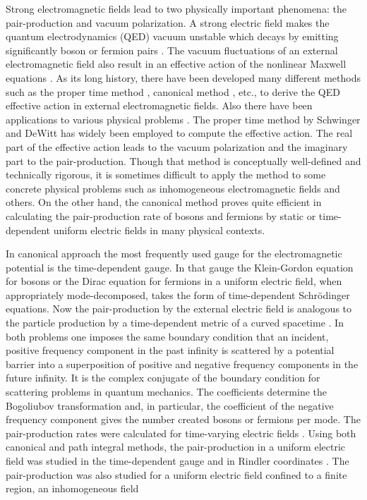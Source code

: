 \documentclass[a4paper,prd,showpacs,preprintnumbers,amsmath,amssymb]{revtex4}
\begin{document}
Strong electromagnetic fields lead to two physically important
phenomena: the pair-production and vacuum polarization. A strong
electric field makes the quantum electrodynamics (QED) vacuum
unstable which decays by emitting significantly boson or fermion
pairs \cite{sau,hei,sch}. The vacuum fluctuations of an external
electromagnetic field also result in an effective action of the
nonlinear Maxwell equations \cite{hei,sch,wei}.  As its long
history, there have been developed many different methods such as
the proper time method \cite{sch,dew}, canonical method
\cite{dew}, etc., to derive the QED effective action in external
electromagnetic fields. Also there have been applications to
various physical problems \cite{gre}. The proper time method by
Schwinger \cite{sch} and DeWitt \cite{dew} has widely been
employed to compute the effective action. The real part of the
effective action leads to the vacuum polarization and the
imaginary part to the pair-production. Though that method is
conceptually well-defined and technically rigorous, it is
sometimes difficult to apply the method to some concrete physical
problems such as inhomogeneous electromagnetic fields and others.
On the other hand, the canonical method \cite{dew} proves quite
efficient in calculating the pair-production rate of bosons and
fermions by static or time-dependent uniform electric fields in
many physical contexts.





In canonical approach the most frequently used gauge for the
electromagnetic potential is the time-dependent gauge. In that
gauge the Klein-Gordon equation for bosons or the Dirac equation
for fermions in a uniform electric field, when appropriately
mode-decomposed, takes the form of time-dependent Schr\"{o}dinger
equations. Now the pair-production by the external electric field
is analogous to the particle production by a time-dependent metric
of a curved spacetime \cite{par,par2,par3}. In both problems one
imposes the same boundary condition that an incident, positive
frequency component in the past infinity is scattered by a
potential barrier into a superposition of positive and negative
frequency components in the future infinity. It is the complex
conjugate of the boundary condition for scattering problems in
quantum mechanics. The coefficients determine the Bogoliubov
transformation and, in particular, the coefficient of the negative
frequency component gives the number created bosons or fermions
per mode. The pair-production rates were calculated for
time-varying electric fields
\cite{bre,nar,pop,pop2,cor,bal,klu,dun}. Using both canonical and
path integral methods, the pair-production in a uniform electric
field was studied in the time-dependent gauge \cite{pad,pad2} and
in Rindler coordinates \cite{gab}. The pair-production was also
studied for a uniform electric field confined to a finite region,
an inhomogeneous field \cite{wan,mar,mar2}
\end{document}
